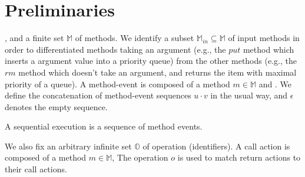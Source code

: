 \section{Preliminaries}
\label{sec:preliminaries}


, and a finite set $\mathbb{M}$ of methods. %
We identify a subset $\mathbb{M}_{\textit{in}} \subseteq \mathbb{M}$ of input methods in order to differentiated methods taking an argument (e.g., the $\textit{put}$ method which inserts a argument value into a priority queue) from the other methods (e.g., the $\textit{rm}$ method which doesn't take an argument, and returns the item with maximal priority of a queue). A method-event is composed of a method $m \in \mathbb{M}$ and . We define the concatenation of method-event sequences $u \cdot v$ in the usual way, and $\epsilon$ denotes the empty sequence.

\begin{definition}\label{def:sequential execution}
A sequential execution is a sequence of method events.
\end{definition}

We also fix an arbitrary infinite set $\mathbb{O}$ of operation (identifiers). A call action is composed of a method $m \in \mathbb{M}$,  The operation $o$ is used to match return actions to their call actions.



